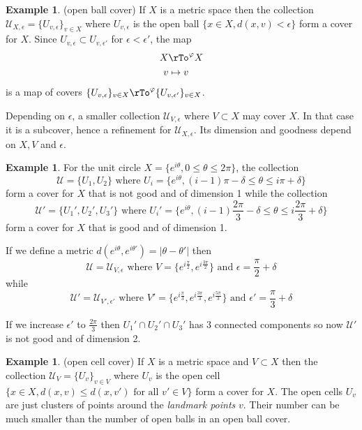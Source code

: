 \documentclass[12pt]{amsart}
\theoremstyle{definition}
\newtheorem{example}[theorem]{Example}
\begin{document}
\begin{example}\label{openballcover} (open ball cover) If $X$ is a metric space then the collection $\mathcal{U}_{X, \epsilon} = \{U_{v, \epsilon}\}_{v \in X}$ where $U_{v, \epsilon}$ is the open ball $\{x \in X, d(x, v) < \epsilon\}$ form a cover for $X$. Since $U_{v, \epsilon} \subset U_{v, \epsilon'}$ for $\epsilon < \epsilon'$, the map
\begin{align*}
X & \rTo^{\varphi} X \\
v & \mapsto v
\end{align*}
is a map of covers $\{U_{v, \epsilon}\}_{v \in X} \rTo^{\varphi} \{U_{v, \epsilon'}\}_{v \in X}$.

Depending on $\epsilon$, a smaller collection $\mathcal{U}_{V, \epsilon}$ where $V \subset X$ may cover $X$. In that case it is a subcover, hence a refinement for $\mathcal{U}_{X, \epsilon}$. Its dimension and goodness depend on $X, V$ and $\epsilon$.
\end{example}

\begin{example}\label{coversforunitcircle} For the unit circle $X = \{e^{i \theta}, 0 \leq \theta \leq 2\pi\}$, the collection $$\mathcal{U} = \{U_1, U_2\} \text{ where } U_i = \{e^{i \theta}, (i-1)\pi - \delta \leq \theta \leq i\pi + \delta\}$$
form a cover for $X$ that is not good and of dimension 1 while the collection
$$\mathcal{U}' = \{U_1', U_2', U_3'\} \text{ where } U_i' = \{e^{i \theta}, (i-1)\frac{2 \pi}{3} - \delta \leq \theta \leq i\frac{2\pi}{3} + \delta\}$$
form a cover for $X$ that is good and of dimension 1.

If we define a metric $d(e^{i\theta}, e^{i\theta'}) = |\theta - \theta'|$ then
$$\mathcal{U} = \mathcal{U}_{V, \epsilon} \text{ where } V = \{e^{i\frac{\pi}{2}}, e^{i\frac{3\pi}{2}}\} \text{ and } \epsilon = \frac{\pi}{2} + \delta$$
while
$$\mathcal{U}' = \mathcal{U}_{V', \epsilon'} \text{ where } V' = \{e^{i\frac{\pi}{3}}, e^{i\frac{3\pi}{3}}, e^{i\frac{5\pi}{3}}\} \text{ and } \epsilon' = \frac{\pi}{3} + \delta$$

If we increase $\epsilon'$ to $\frac{2\pi}{3}$ then $U_1' \cap U_2' \cap U_3'$ has 3 connected components so now $\mathcal{U}'$ is not good and of dimension 2.
\end{example}

\begin{example}\label{opencellcover} (open cell cover) If $X$ is a metric space and $V \subset X$ then the collection $\mathcal{U}_V = \{U_v\}_{v \in V}$ where $U_v$ is the open cell $\{x \in X, d(x, v) \leq d(x, v') \text{ for all } v' \in V\}$ form a cover for $X$. The open cells $U_v$ are just clusters of points around the {\it landmark points} $v$. Their number can be much smaller than the number of open balls in an open ball cover.
\end{example}
\end{document}
